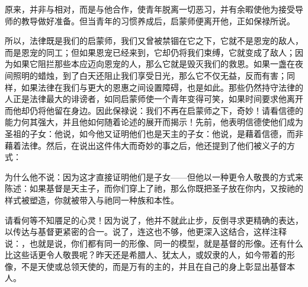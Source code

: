 原来，并非与相对，而是与他合作，使青年脱离一切恶习，并有余暇使他为接受导师的教导做好准备。但当青年的习惯养成后，启蒙师便离开他，正如保禄所说。\par

\par

所以，法律既是我们的启蒙师，我们又曾被禁锢在它之下，它就不是恩宠的敌人，而是恩宠的同工；但如果恩宠已经来到，它却仍将我们束缚，它就变成了敌人；因为如果它阻拦那些本应迈向恩宠的人，那么它就是毁灭我们的救恩。如果一盏在夜间照明的蜡烛，到了白天还阻止我们享受日光，那么它不仅无益，反而有害；同样，如果法律在我们与更大的恩惠之间设置障碍，也是如此。那些仍然持守法律的人正是法律最大的诽谤者，如同启蒙师使一个青年变得可笑，如果时间要求他离开而他却仍将他留在身边。因此保禄说：我们不再在启蒙师之下，奇妙！请看信德的能力何其强大，并且他如何随着论述的展开而揭示！先前，他表明信德使他们成为圣祖的子女：他说，如今他又证明他们也是天主的子女：他说，是藉着信德，而非藉着法律。然后，在说出这件伟大而奇妙的事之后，他还提到了他们被义子的方式：\par

 \par

为什么他不说：因为这才直接证明他们是子女——但他以一种更令人敬畏的方式来陈述：如果基督是天主子，而你们穿上了祂，那么你既把圣子放在你内，又按祂的样式被塑造，你就被带入与祂同一种族和本性。\par

 \par

请看何等不知餍足的心灵！因为说了，他并不就此止步，反倒寻求更精确的表达，以传达与基督更紧密的合一。说了，连这也不够，他更深入这结合，这样注释说：，也就是说，你们都有同一的形像、同一的模型，就是基督的形像。还有什么比这些话更令人敬畏呢？昨天还是希腊人、犹太人，或奴隶的人，如今带着的形像，不是天使或总领天使的，而是万有的主的，并且在自己的身上彰显出基督本人。\par

